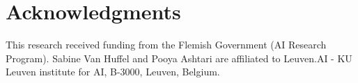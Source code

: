\section*{Acknowledgments}

This research received funding from the Flemish Government (AI Research Program). Sabine Van Huffel and Pooya Ashtari are affiliated to Leuven.AI - KU Leuven institute for AI, B-3000, Leuven, Belgium.